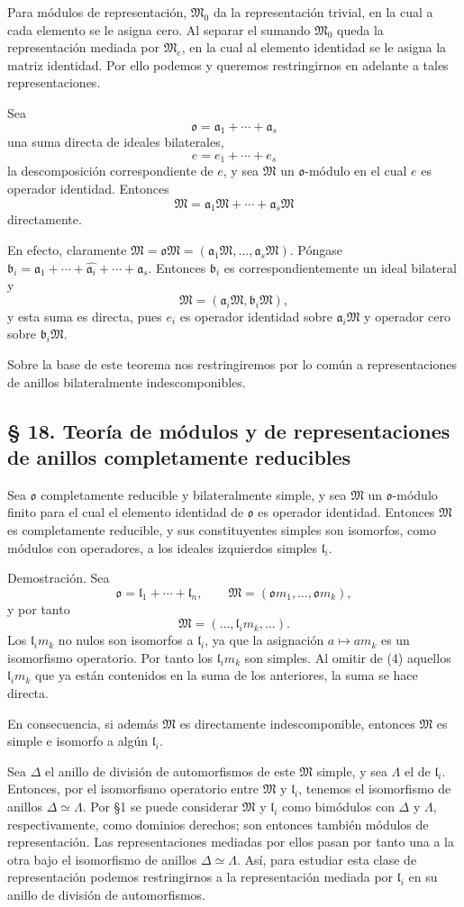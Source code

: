 \documentclass[11pt]{article}
\providecommand{\mM}{\mathfrak{M}}
\providecommand{\mo}{\mathfrak{o}}
\providecommand{\ma}{\mathfrak{a}}
\providecommand{\mb}{\mathfrak{b}}
\providecommand{\ml}{\mathfrak{l}}
\begin{document}
Para módulos de representación, $\mM_0$ da la representación trivial, en la cual a cada elemento se le asigna cero. Al separar el sumando $\mM_0$ queda la representación mediada por $\mM_e$, en la cual al elemento identidad se le asigna la matriz identidad. Por ello podemos y queremos restringirnos en adelante a tales representaciones.

Sea
\[
        \mo=\ma_1+\cdots+\ma_s
\]
una suma directa de ideales bilaterales,
\[
        e=e_1+\cdots+e_s
\]
la descomposición correspondiente de $e$, y sea $\mM$ un $\mo$-módulo en el cual $e$ es operador identidad. Entonces
\[
        \mM=\ma_1\mM+\cdots+\ma_s\mM
\]
directamente.

En efecto, claramente $\mM=\mo\mM=(\ma_1\mM,\ldots,\ma_s\mM)$. Póngase $\mb_i=\ma_1+\cdots+\widehat{\ma_i}+\cdots+\ma_s$. Entonces $\mb_i$ es correspondientemente un ideal bilateral y
\[
        \mM=(\ma_i\mM,\mb_i\mM),
\]
y esta suma es directa, pues $e_i$ es operador identidad sobre $\ma_i\mM$ y operador cero sobre $\mb_i\mM$.

Sobre la base de este teorema nos restringiremos por lo común a representaciones de anillos bilateralmente indescomponibles.

\subsection*{§ 18. Teoría de módulos y de representaciones de anillos completamente reducibles}

Sea $\mo$ completamente reducible y bilateralmente simple, y sea $\mM$ un $\mo$-módulo finito para el cual el elemento identidad de $\mo$ es operador identidad. Entonces $\mM$ es completamente reducible, y sus constituyentes simples son isomorfos, como módulos con operadores, a los ideales izquierdos simples $\ml_i$.

Demostración. Sea
\[
        \mo=\ml_1+\cdots+\ml_n,
        \qquad
        \mM=(\mo m_1,\ldots,\mo m_k),
\]
y por tanto
\[
        \mM=(\ldots,\ml_i m_k,\ldots).                         \tag{4}
\]
Los $\ml_i m_k$ no nulos son isomorfos a $\ml_i$, ya que la asignación $a\mapsto am_k$ es un isomorfismo operatorio. Por tanto los $\ml_i m_k$ son simples. Al omitir de (4) aquellos $\ml_i m_k$ que ya están contenidos en la suma de los anteriores, la suma se hace directa.

En consecuencia, si además $\mM$ es directamente indescomponible, entonces $\mM$ es simple e isomorfo a algún $\ml_i$.

Sea $\Delta$ el anillo de división de automorfismos de este $\mM$ simple, y sea $\Lambda$ el de $\ml_i$. Entonces, por el isomorfismo operatorio entre $\mM$ y $\ml_i$, tenemos el isomorfismo de anillos $\Delta\simeq\Lambda$. Por §1 se puede considerar $\mM$ y $\ml_i$ como bimódulos con $\Delta$ y $\Lambda$, respectivamente, como dominios derechos; son entonces también módulos de representación. Las representaciones mediadas por ellos pasan por tanto una a la otra bajo el isomorfismo de anillos $\Delta\simeq\Lambda$. Así, para estudiar esta clase de representación podemos restringirnos a la representación mediada por $\ml_i$ en su anillo de división de automorfismos.
\end{document}
